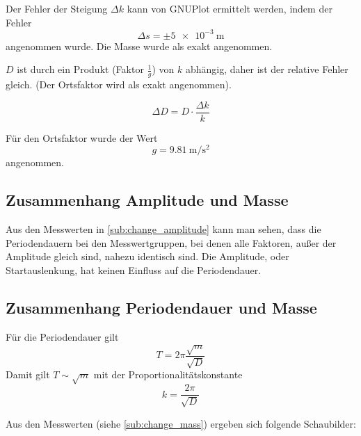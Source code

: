 Der Fehler der Steigung $\Delta k$ kann von GNUPlot ermittelt werden, indem der Fehler
$$\Delta s = \pm \SI{5e-3}{\meter}$$
angenommen wurde. Die Masse wurde als exakt angenommen.

$D$ ist durch ein Produkt (Faktor $\frac{1}{g}$) von $k$ abhängig, daher ist der relative Fehler gleich. (Der Ortsfaktor wird als exakt angenommen).

$$\Delta D = D \cdot \frac{\Delta k}{k}$$

Für den Ortsfaktor wurde der Wert
$$g = \SI{9.81}{\meter\per\square\second}$$
angenommen.

\subsection{Zusammenhang Amplitude und Masse}
Aus den Messwerten in \ref{sub:change_amplitude} kann man sehen, dass die Periodendauern bei den Messwertgruppen, bei denen alle Faktoren, außer der Amplitude gleich sind, nahezu identisch sind. Die Amplitude, oder Startauslenkung, hat keinen Einfluss auf die Periodendauer.

\subsection{Zusammenhang Periodendauer und Masse}
Für die Periodendauer gilt
$$T = 2\pi \frac{\sqrt{m}}{\sqrt{D}}$$
Damit gilt $T \sim \sqrt{m}$ mit der Proportionalitätskonstante
$$k = \frac{2\pi}{\sqrt{D}}$$

Aus den Messwerten (siehe \ref{sub:change_mass}) ergeben sich folgende Schaubilder:

